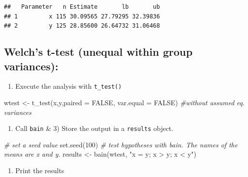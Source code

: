 \documentclass[
]{book}
\newenvironment{Shaded}{\begin{snugshade}}{\end{snugshade}}
\newcommand{\AttributeTok}[1]{\textcolor[rgb]{0.77,0.63,0.00}{#1}}
\newcommand{\CommentTok}[1]{\textcolor[rgb]{0.56,0.35,0.01}{\textit{#1}}}
\newcommand{\ConstantTok}[1]{\textcolor[rgb]{0.00,0.00,0.00}{#1}}
\newcommand{\DecValTok}[1]{\textcolor[rgb]{0.00,0.00,0.81}{#1}}
\newcommand{\FunctionTok}[1]{\textcolor[rgb]{0.00,0.00,0.00}{#1}}
\newcommand{\NormalTok}[1]{#1}
\newcommand{\OtherTok}[1]{\textcolor[rgb]{0.56,0.35,0.01}{#1}}
\newcommand{\StringTok}[1]{\textcolor[rgb]{0.31,0.60,0.02}{#1}}
\providecommand{\tightlist}{%
  \setlength{\itemsep}{0pt}\setlength{\parskip}{0pt}}
\begin{document}
\begin{verbatim}
##   Parameter   n Estimate       lb       ub
## 1         x 115 30.09565 27.79295 32.39836
## 2         y 125 28.85600 26.64732 31.06468
\end{verbatim}

\hypertarget{welchs-t-test-unequal-within-group-variances}{%
\subsection{Welch's t-test (unequal within group variances):}\label{welchs-t-test-unequal-within-group-variances}}

\begin{enumerate}
\def\labelenumi{\arabic{enumi})}
\tightlist
\item
  Execute the analysis with \texttt{t\_test()}
\end{enumerate}

\begin{Shaded}
\begin{Highlighting}[]
\NormalTok{wtest }\OtherTok{\textless{}{-}} \FunctionTok{t\_test}\NormalTok{(x,y,}\AttributeTok{paired =} \ConstantTok{FALSE}\NormalTok{, }\AttributeTok{var.equal =} \ConstantTok{FALSE}\NormalTok{) }\CommentTok{\#without assumed eq. variances}
\end{Highlighting}
\end{Shaded}

\begin{enumerate}
\def\labelenumi{\arabic{enumi})}
\setcounter{enumi}{1}
\tightlist
\item
  Call \texttt{bain} \& 3) Store the output in a \texttt{results} object.
\end{enumerate}

\begin{Shaded}
\begin{Highlighting}[]
\CommentTok{\# set a seed value}
\FunctionTok{set.seed}\NormalTok{(}\DecValTok{100}\NormalTok{)}
\CommentTok{\# test hypotheses with bain. The names of the means are x and y.}
\NormalTok{results }\OtherTok{\textless{}{-}} \FunctionTok{bain}\NormalTok{(wtest, }\StringTok{"x = y; x \textgreater{} y; x \textless{} y"}\NormalTok{)}
\end{Highlighting}
\end{Shaded}

\begin{enumerate}
\def\labelenumi{\arabic{enumi})}
\setcounter{enumi}{2}
\tightlist
\item
  Print the results
\end{enumerate}
\end{document}
